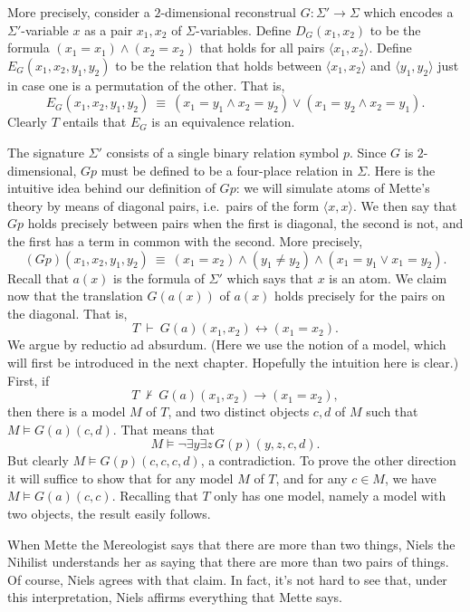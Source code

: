 \begin{example}
  More precisely, consider a $2$-dimensional reconstrual
  $G:\Sigma '\to \Sigma$ which encodes a $\Sigma '$-variable $x$ as a
  pair $x_1,x_2$ of $\Sigma$-variables.  Define $D_G(x_1,x_2)$ to be
  the formula $(x_1=x_1)\wedge (x_2=x_2)$ that holds for all pairs
  $\langle x_1,x_2\rangle$.  Define $E_G(x_1,x_2,y_1,y_2)$ to be the
  relation that holds between $\langle x_1,x_2\rangle$ and
  $\langle y_1,y_2\rangle$ just in case one is a permutation of the
  other.  That is,
  \[ E_G(x_1,x_2,y_1,y_2) \: \equiv \: (x_1=y_1\wedge x_2=y_2)\vee
    (x_1=y_2\wedge x_2=y_1 ) .\] Clearly $T$ entails that $E_G$ is an
  equivalence relation.

  The signature $\Sigma '$ consists of a single binary relation symbol
  $p$.  Since $G$ is $2$-dimensional, $Gp$ must be defined to be a
  four-place relation in $\Sigma$.  Here is the intuitive idea behind
  our definition of $Gp$: we will simulate atoms of Mette's theory by
  means of diagonal pairs, i.e.\ pairs of the form
  $\langle x,x\rangle$.  We then say that $Gp$ holds precisely between
  pairs when the first is diagonal, the second is not, and the first
  has a term in common with the second.  More precisely,
  \[ (Gp)(x_1,x_2,y_1,y_2) \: \equiv \: (x_1=x_2)\wedge (y_1\neq y_2
    )\wedge (x_1=y_1\vee x_1=y_2) .\] Recall that $a(x)$ is the
  formula of $\Sigma '$ which says that $x$ is an atom.  We claim now
  that the translation $G(a(x))$ of $a(x)$ holds precisely for the
  pairs on the diagonal.  That is,
  \[ T\:\vdash \: G(a)(x_1,x_2)\leftrightarrow (x_1=x_2 ) .\] We argue
  by reductio ad absurdum.  (Here we use the notion of a model, which
  will first be introduced in the next chapter.  Hopefully the
  intuition here is clear.)  First, if
  \[ T\:\not\vdash \: G(a)(x_1,x_2)\rightarrow (x_1=x_2 ), \] then
  there is a model $M$ of $T$, and two distinct objects $c,d$ of $M$
  such that $M\models G(a)(c,d)$.  That means that
  \[ M\models \neg \exists y\exists z\, G(p)(y,z,c,d) .\] But clearly
  $M\models G(p)(c,c,c,d)$, a contradiction.  To prove the other
  direction it will suffice to show that for any model $M$ of $T$, and
  for any $c\in M$, we have $M\models G(a)(c,c)$.  Recalling that $T$
  only has one model, namely a model with two objects, the result
  easily follows.
  
  When Mette the Mereologist says that there are more than two things,
  Niels the Nihilist understands her as saying that there are more
  than two pairs of things.  Of course, Niels agrees with that claim.
  In fact, it's not hard to see that, under this interpretation, Niels
  affirms everything that Mette says. \end{example}

